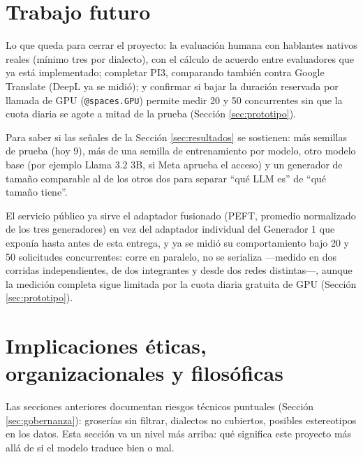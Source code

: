\documentclass[11pt,a4paper]{article}
\begin{document}
\section{Trabajo futuro}
\label{sec:trabajo-futuro}

Lo que queda para cerrar el proyecto: la evaluación humana con hablantes nativos reales (mínimo tres por dialecto), con el cálculo de acuerdo entre evaluadores que ya está implementado; completar PI3, comparando también contra Google Translate (DeepL ya se midió); y confirmar si bajar la duración reservada por llamada de GPU (\texttt{@spaces.GPU}) permite medir 20 y 50 concurrentes sin que la cuota diaria se agote a mitad de la prueba (Sección \ref{sec:prototipo}).

Para saber si las señales de la Sección \ref{sec:resultados} se sostienen: más semillas de prueba (hoy 9), más de una semilla de entrenamiento por modelo, otro modelo base (por ejemplo Llama 3.2 3B, si Meta aprueba el acceso) y un generador de tamaño comparable al de los otros dos para separar ``qué LLM es'' de ``qué tamaño tiene''.

El servicio público ya sirve el adaptador fusionado (PEFT, promedio normalizado de los tres generadores) en vez del adaptador individual del Generador 1 que exponía hasta antes de esta entrega, y ya se midió su comportamiento bajo 20 y 50 solicitudes concurrentes: corre en paralelo, no se serializa ---medido en dos corridas independientes, de dos integrantes y desde dos redes distintas---, aunque la medición completa sigue limitada por la cuota diaria gratuita de GPU (Sección \ref{sec:prototipo}).

\section{Implicaciones éticas, organizacionales y filosóficas}
\label{sec:implicaciones}

Las secciones anteriores documentan riesgos técnicos puntuales (Sección \ref{sec:gobernanza}): groserías sin filtrar, dialectos no cubiertos, posibles estereotipos en los datos. Esta sección va un nivel más arriba: qué significa este proyecto más allá de si el modelo traduce bien o mal.
\end{document}

